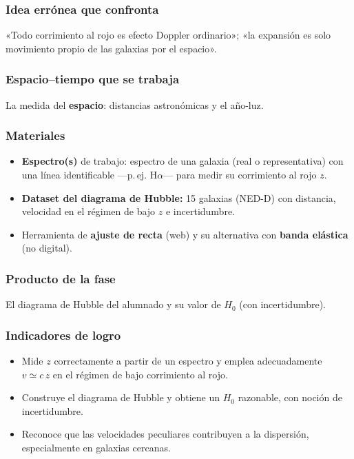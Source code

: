\subsubsection*{Idea errónea que confronta}

«Todo corrimiento al rojo es efecto Doppler ordinario»; «la expansión es solo movimiento propio de las galaxias por el espacio».

\subsubsection*{Espacio--tiempo que se trabaja}

La medida del \textbf{espacio}: distancias astronómicas y el año-luz.

\subsubsection*{Materiales}

\begin{itemize}
\item \textbf{Espectro(s)} de trabajo: espectro de una galaxia (real o representativa) con una línea identificable ---p.\,ej. H$\alpha$--- para medir su corrimiento al rojo $z$.
\item \textbf{Dataset del diagrama de Hubble:} 15 galaxias (NED-D) con distancia, velocidad en el régimen de bajo $z$ e incertidumbre.
\item Herramienta de \textbf{ajuste de recta} (web) y su alternativa con \textbf{banda elástica} (no digital).
\end{itemize}

\subsubsection*{Producto de la fase}

El diagrama de Hubble del alumnado y su valor de $H_{0}$ (con incertidumbre).

\subsubsection*{Indicadores de logro}

\begin{itemize}
\item Mide $z$ correctamente a partir de un espectro y emplea adecuadamente $v \simeq c\,z$ en el régimen de bajo corrimiento al rojo.
\item Construye el diagrama de Hubble y obtiene un $H_{0}$ razonable, con noción de incertidumbre.
\item Reconoce que las velocidades peculiares contribuyen a la dispersión, especialmente en galaxias cercanas.
\end{itemize}

